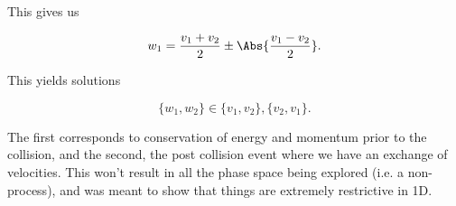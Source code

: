{This gives us

\begin{equation}\label{eqn:midterm1review:260}
w_1 = \frac{v_1 + v_2}{2} \pm \Abs{\frac{v_1 - v_2}{2}}.
\end{equation}

This yields solutions

\begin{equation}\label{eqn:midterm1review:280}
\{w_1, w_2\} \in \{v_1, v_2\}, \{v_2, v_1\}.
\end{equation}

The first corresponds to conservation of energy and momentum prior to the collision, and the second, the post collision event where we have an exchange of velocities.  This won't result in all the phase space being explored (i.e. a non- process), and was meant to show that things are extremely restrictive in 1D.
} %
